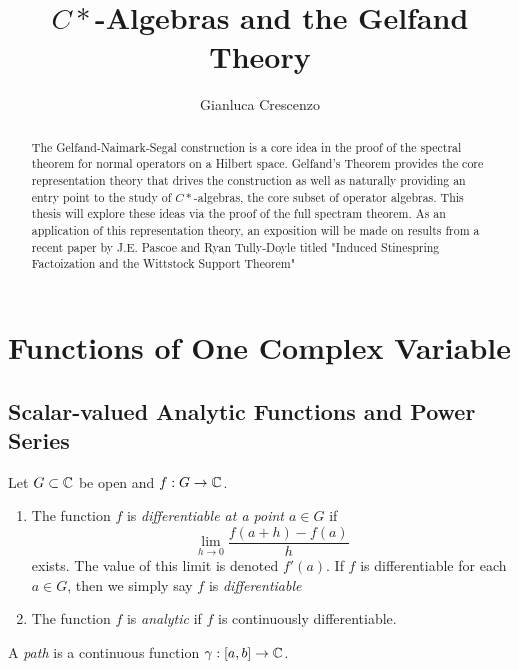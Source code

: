 \documentclass[reqno]{amsart}
\title[Banach and C*-Algebras, En Route to Continuous Functional Calculus]{$C*$-Algebras and the Gelfand Theory}
\author{Gianluca Crescenzo}
\begin{document}
\begin{abstract}
	The Gelfand-Naimark-Segal construction is a core idea in the proof of the spectral theorem for normal operators on a Hilbert space. Gelfand's Theorem provides the core representation theory that drives the construction as well as naturally providing an entry point to the study of $C*$-algebras, the core subset of operator algebras. This thesis will explore these ideas via the proof of the full spectram theorem. As an application of this representation theory, an exposition will be made on results from a recent paper by J.E. Pascoe and Ryan Tully-Doyle titled "Induced Stinespring Factoization and the Wittstock Support Theorem"
\end{abstract}

\maketitle

\iffalse
\section{Functions of One Complex Variable}\label{Section:focv}

\subsection{Scalar-valued Analytic Functions and Power Series}

\begin{definition}
	Let $G \subset \mathbb{C}$ be open and $f:G \rightarrow \mathbb{C}$.
	\mbox{}
	\begin{enumerate}[label = (\arabic*),itemsep=1pt,topsep=3pt]
		\item The function $f$ is \emph{differentiable at a point $a \in G$} if
			\[
				\lim_{h \rightarrow 0}\frac{f(a+h) - f(a)}{h}
			\] 
			exists. The value of this limit is denoted $f'(a)$. If $f$ is differentiable for each $a \in G$, then we simply say $f$ is \emph{differentiable}
		\item The function $f$ is \emph{analytic} if $f$ is continuously differentiable.
	\end{enumerate}
\end{definition}

\begin{definition}
	A \emph{path} is a continuous function $\gamma:[a,b] \rightarrow \mathbb{C}$.
\end{definition}
\end{document}
